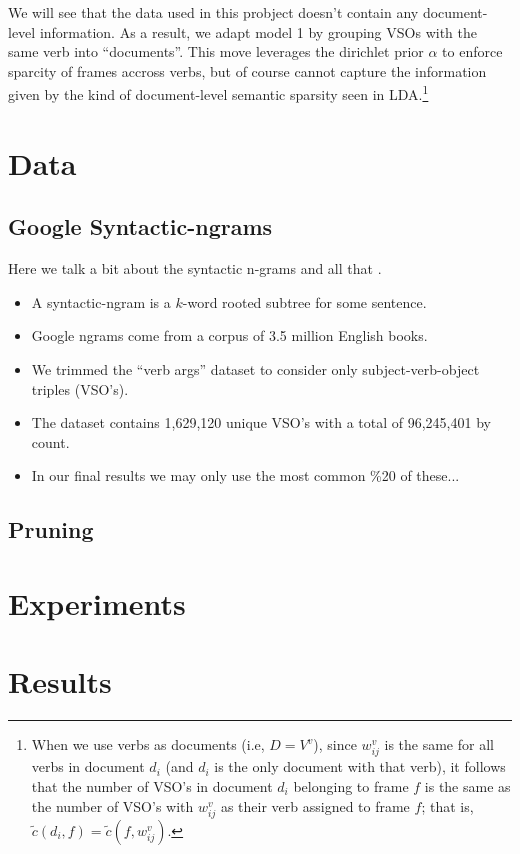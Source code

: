 \documentclass[11pt,twocolumn,DIV=11]{scrartcl}
\begin{document}
We will see that the data used in this probject doesn't contain any document-level
information. As a result, we adapt model 1 by grouping VSOs with the same verb into ``documents''.
This move leverages the dirichlet prior $\alpha$ to enforce sparcity of frames 
accross verbs, but of course cannot capture the information given by the kind of
document-level semantic sparsity seen in LDA.\footnote{When we use verbs as
documents (i.e, $D = V^v$), since $w_{ij}^v$ is the same for all verbs in document $d_i$ 
(and $d_i$ is the only document with that verb), it follows that the number of VSO's in document 
$d_i$ belonging to frame $f$ is the same as the number of VSO's with $w_{ij}^v$ as their verb assigned to 
frame $f$; that is, $\tilde c(d_i, f) = \tilde c(f, w_{ij}^v)$.}

\section{Data}

\subsection{Google Syntactic-ngrams}
Here we talk a bit about the syntactic n-grams and all that \citep{ngrams2013}.
\begin{itemize}
    \item A syntactic-ngram is a $k$-word rooted subtree for some sentence. 
    \item Google ngrams come from a corpus of 3.5 million English books.
    \item We trimmed the ``verb args'' dataset to consider only subject-verb-object triples (VSO's).
    \item The dataset contains 1,629,120 unique VSO's with a total of 96,245,401 by count.
    \item In our final results we may only use the most common \%20 of these...
\end{itemize}

\subsection{Pruning}


\section{Experiments}


\section{Results}
\end{document}
